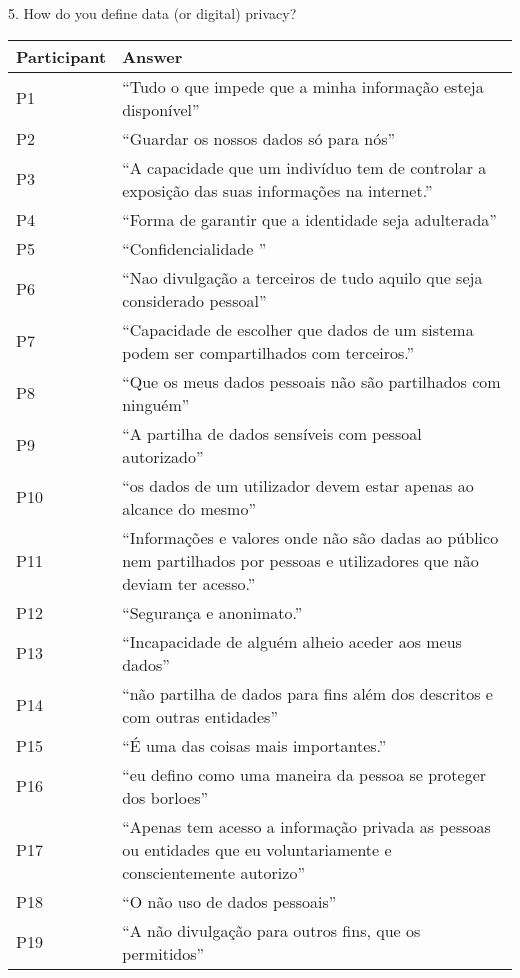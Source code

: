 5. How do you define data (or digital) privacy?

\begin{longtable}{p{3cm} p{13cm}}
    \hline
    \textbf{Participant} & \textbf{Answer} \\
    \hline
    P1 & ``Tudo o que impede que a minha informação esteja disponível'' \\
    \hline
    P2 & ``Guardar os nossos dados só para nós'' \\
    \hline
    P3 & ``A capacidade que um indivíduo tem de controlar a exposição das suas informações na internet.'' \\
    \hline
    P4 & ``Forma de garantir que a identidade seja adulterada'' \\
    \hline
    P5 & ``Confidencialidade '' \\
    \hline
    P6 & ``Nao divulgação a terceiros de tudo aquilo que seja considerado pessoal'' \\
    \hline
    P7 & ``Capacidade de escolher que dados de um sistema podem ser compartilhados com terceiros.'' \\
    \hline
    P8 & ``Que os meus dados pessoais não são partilhados com ninguém'' \\
    \hline
    P9 & ``A partilha de dados sensíveis com pessoal autorizado'' \\
    \hline
    P10 & ``os dados de um utilizador devem estar apenas ao alcance do mesmo'' \\
    \hline
    P11 & ``Informações e valores onde não são dadas ao público nem partilhados por pessoas e utilizadores que não deviam ter acesso.'' \\
    \hline
    P12 & ``Segurança e anonimato.'' \\
    \hline
    P13 & ``Incapacidade de alguém alheio aceder aos meus dados'' \\
    \hline
    P14 & ``não partilha de dados para fins além dos descritos e com outras entidades'' \\
    \hline
    P15 & ``É uma das coisas mais importantes.'' \\
    \hline
    P16 & ``eu defino  como  uma maneira da pessoa se proteger dos borloes'' \\
    \hline
    P17 & ``Apenas tem acesso a informação privada as pessoas ou entidades que eu voluntariamente e conscientemente autorizo'' \\
    \hline
    P18 & ``O não uso de dados pessoais'' \\
    \hline
    P19 & ``A não divulgação para outros fins, que os permitidos'' \\

\end{longtable}
